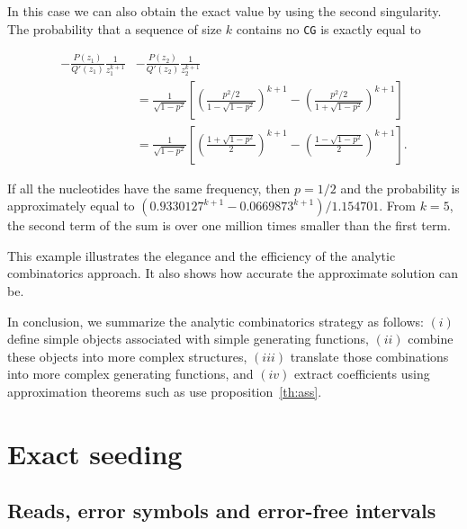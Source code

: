\documentclass{article}
\begin{document}
In this case we can also obtain the exact value by using the second
singularity. The probability that a sequence of size $k$ contains no
\texttt{CG} is exactly equal to

\begin{equation*}
\begin{split}
-\frac{P(z_1)}{Q'(z_1)}\frac{1}{z_1^{k+1}}
&-\frac{P(z_2)}{Q'(z_2)}\frac{1}{z_2^{k+1}} \\
&=
\frac{1}{\sqrt{1-p^2}} \left[
\left( \frac{p^2/2}{1-\sqrt{1-p^2}} \right)^{k+1}
- \left( \frac{p^2/2}{1+\sqrt{1-p^2}} \right)^{k+1}\right] \\
&= \frac{1}{\sqrt{1-p^2}} \left[
\left(\frac{1+\sqrt{1-p^2}}{2} \right)^{k+1} -
\left(\frac{1-\sqrt{1-p^2}}{2} \right)^{k+1} \right].
\end{split}
\end{equation*}

If all the nucleotides have the same frequency, then $p=1/2$ and the
probability is approximately equal to $(0.9330127^{k+1} - 0.0669873^{k+1})
/ 1.154701$. From $k=5$, the second term of the sum is over one million
times smaller than the first term.

This example illustrates the elegance and the efficiency of the analytic
combinatorics approach. It also shows how accurate the approximate
solution can be.

In conclusion, we summarize the analytic combinatorics strategy as
follows: $(i)$ define simple objects associated with simple generating
functions, $(ii)$ combine these objects into more complex structures,
$(iii)$ translate those combinations into more complex generating
functions, and $(iv)$ extract coefficients using approximation theorems
such as use proposition~\ref{th:ass}.











\section{Exact seeding}
\label{sec:seeding}

\subsection{Reads, error symbols and error-free intervals}
\end{document}
